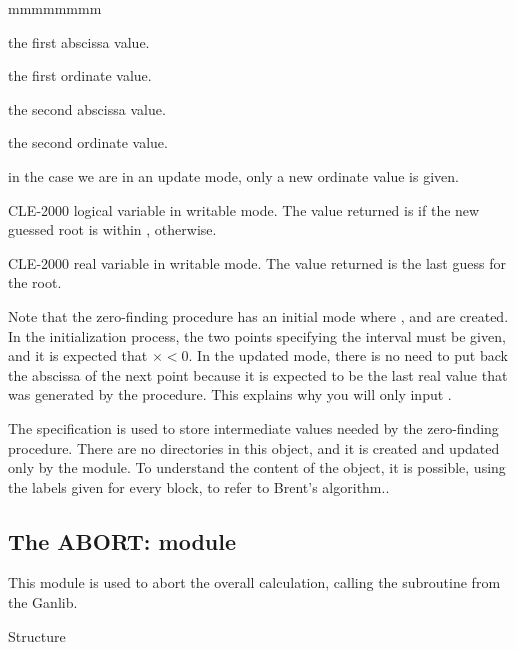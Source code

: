 \begin{ListeDeDescription}{mmmmmmmm}
\item[\dusa{x1}] the first abscissa value.

\item[\dusa{y1}] the first ordinate value.

\item[\dusa{x2}] the second abscissa value.

\item[\dusa{y2}] the second ordinate value.

\item[\dusa{y3}] in the case we are in an update mode,
only a new ordinate value is given.

\item[\dusa{lFlag}] CLE-2000 logical variable in writable mode. The value
returned is  if the new guessed root is within ,
  otherwise.

\item[\dusa{rRoot}] CLE-2000 real variable in writable mode. The value
returned is the last guess for the root.

\end{ListeDeDescription}

Note that the zero-finding procedure has an initial mode where ,
 and  are created. In the initialization process,
the two points specifying the interval must be given, and it is expected
that  $\times$$< 0$.
In the updated mode, there is no need to put back the abscissa of the next point
because it is expected to be the last real value that was generated by the
procedure. This explains why you will only input  .

The  specification is used to store intermediate values needed
by the zero-finding procedure.
There are no directories in this object, and it is created and updated only by
the  module.
To understand the content of the object, it is possible, using the labels given
for every block, to refer to Brent's algorithm.\cite{recipie}.

\subsection{The ABORT: module}\label{sect:ABORTData}

This module is used to abort the overall calculation, calling the 
subroutine from the Ganlib.

\vskip -0.2cm

\begin{DataStructure}{Structure }
 \moc{;}
\end{DataStructure}

